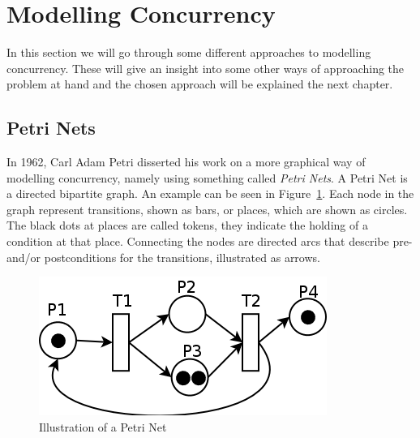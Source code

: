 
\section{Modelling Concurrency}

In this section we will go through some different approaches to modelling concurrency. These will give an insight into some other ways of approaching the problem at hand and the chosen approach will be explained the next chapter.

\subsection{Petri Nets}

In 1962, Carl Adam Petri disserted his work on a more graphical way of modelling concurrency, namely using something called \textit{Petri Nets}. A Petri Net is a directed bipartite graph. An example can be seen in Figure~\ref{fig:petri_net}. Each node in the graph represent transitions, shown as bars, or places, which are shown as circles. The black dots at places are called tokens, they indicate the holding of a condition at that place. Connecting the nodes are directed arcs that describe pre- and/or postconditions for the transitions, illustrated as arrows. 

\begin{figure}[h]
    \includegraphics[scale=0.5]{include/figures/petri_net}
    \caption{Illustration of a Petri Net}
    \label{fig:petri_net}
\end{figure}

